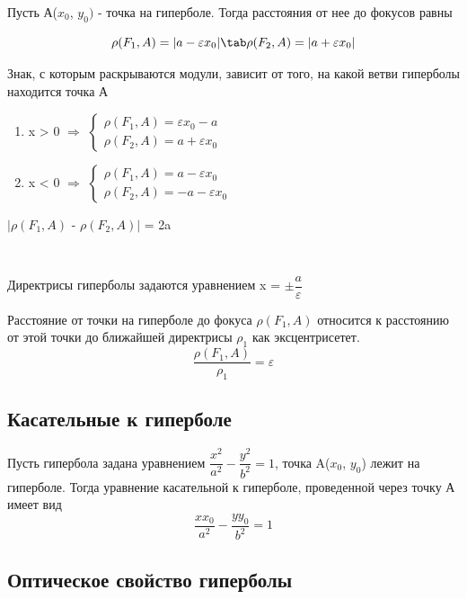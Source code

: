 Пусть А($x_0$, $y_0)$ - точка на гиперболе. Тогда расстояния от нее до фокусов равны

\[
\rho(F_1, A) = |a - \varepsilon x_0|
\tab\\
\rho(F_2, A) = |a + \varepsilon x_0|
\]

Знак, с которым раскрываются модули, зависит от того, на какой ветви гиперболы находится точка А
\begin{enumerate}
    \item x > 0 $\Longrightarrow$
    $\begin{cases}
        \rho(F_1, A) = \varepsilon x_0 - a\\
        \rho(F_2, A) = a + \varepsilon x_0
    \end{cases}$
    \item x < 0 $\Longrightarrow$
    $\begin{cases}
        \rho(F_1, A) = a - \varepsilon x_0\\
        \rho(F_2, A) = -a - \varepsilon x_0
    \end{cases}$
\end{enumerate}

\begin{proposition}
    $|\rho(F_1, A)$ - $\rho(F_2, A)|$ = 2a
\end{proposition}
\tab\\
\begin{definition}
    Директрисы гиперболы задаются уравнением x = $\pm\dfrac{a}{\varepsilon}$
\end{definition}

\begin{proposition}
    Расстояние от точки на гиперболе до фокуса $\rho(F_1, A)$ относится к расстоянию от этой точки до ближайшей директрисы $\rho_1$ как эксцентрисетет.
    \[
    \dfrac{\rho(F_1, A)}{\rho_1} = \varepsilon
    \]
\end{proposition}
\clearpage

\subsection{Касательные к гиперболе}

Пусть гипербола задана уравнением $\dfrac{x^2}{a^2} - \dfrac{y^2}{b^2} = 1$, точка A($x_0$, $y_0$) лежит на гиперболе. Тогда уравнение касательной к гиперболе, проведенной через точку А имеет вид
    \[
    \dfrac{xx_0}{a^2} - \dfrac{yy_0}{b^2} = 1
    \]
\subsection{Оптическое свойство гиперболы}

